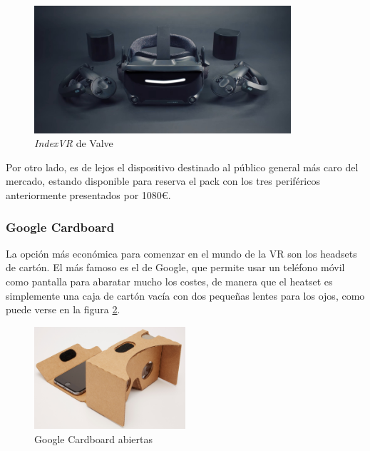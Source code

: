 \begin{figure}[!h]
\begin{center}
    \includegraphics[width=0.85\textwidth]{imagenes/2/indexvr.jpg}
    \caption{\textit{IndexVR} de Valve}
    \label{fig:index-vr}
\end{center}
\end{figure}

Por otro lado, es de lejos el dispositivo destinado al público general más caro del mercado, estando disponible para reserva el pack con los tres periféricos anteriormente presentados por 1080\euro.

\subsubsection{Google Cardboard} 

La opción más económica para comenzar en el mundo de la \acs{VR} son los headsets de cartón. El más famoso es el de Google, que permite usar un teléfono móvil como pantalla para abaratar mucho los costes, de manera que el heatset es simplemente una caja de cartón vacía con dos pequeñas lentes para los ojos, como puede verse en la figura \ref{fig:google-cardboard}.
    
\begin{figure}[!h]
\begin{center}
\includegraphics[width=0.5\textwidth]{imagenes/2/cardboard.jpg}
\caption{Google Cardboard abiertas}
\label{fig:google-cardboard}
\end{center}
\end{figure}

